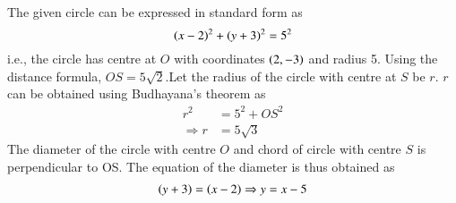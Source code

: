 The given circle can be expressed in standard form as
%
\begin{equation}
\left(x-2\right)^2 + \left(y+3\right)^2 = 5^2
\end{equation}
%
i.e., the circle has centre at $O$ with coordinates $\left(2,-3\right)$ and radius 5. Using the distance formula, $OS = 5\sqrt{2}.  $Let the radius of the circle with centre at $S$ be $r$. $r$ can be obtained using Budhayana's theorem as 
%
\begin{align}
r^2 &= 5^2 + OS^2 
\\
\Rightarrow r &= 5 \sqrt{3}
\end{align}
% 
The diameter of the circle with centre $O$ and chord of circle with centre $S$ is perpendicular to OS. The equation of the diameter is thus obtained as
%
\begin{align}
\left(y + 3\right) = \left(x-2\right) \Rightarrow y = x -5
\end{align}
%
